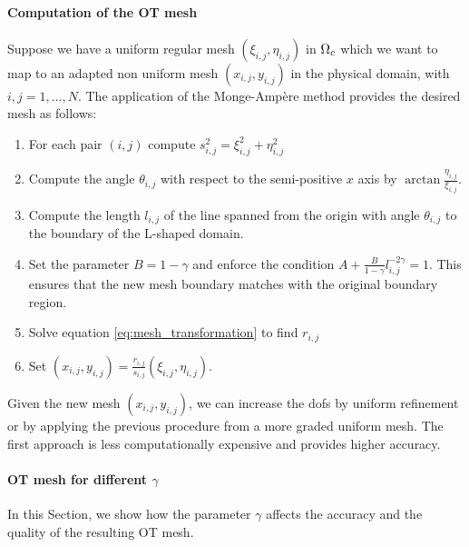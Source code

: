 \documentclass[a4paper,11pt]{article}
\begin{document}
\paragraph{Computation of the OT mesh}

Suppose we have a uniform regular mesh $(\xi_{i,j},\eta_{i,j})$ in $\Omega_{c}$ which we want to map to an adapted non uniform mesh $(x_{i,j},y_{i,j})$ in the physical domain, with $i,j = 1,\dots,N$. The application of the Monge-Ampère method provides the desired mesh as follows:

\begin{enumerate}
    \item For each pair $(i,j)$ compute $s_{i,j}^{2} = \xi_{i,j}^{2} + \eta_{i,j}^{2}$
    \item Compute the angle $\theta_{i,j}$ with respect to the semi-positive $x$ axis by $\arctan{\frac{\eta_{i,j}}{\xi_{i,j}}}$. 
    \item Compute the length $l_{i,j}$ of the line spanned from the origin with angle $\theta_{i,j}$ to the boundary of the L-shaped domain.
    \item Set the parameter $B = 1 - \gamma$ and enforce the condition $A + \frac{B}{1-\gamma}l_{i,j}^{-2\gamma} = 1$. This ensures that the new mesh boundary matches with the original boundary region.
      
    \item Solve equation \eqref{eq:mesh_transformation} to find $r_{i,j}$
    \item Set $(x_{i,j},y_{i,j}) = \frac{r_{i,j}}{s_{i,j}}(\xi_{i,j},\eta_{i,j})$.
\end{enumerate}


Given the new mesh $(x_{i,j},y_{i,j})$, we can increase the dofs by uniform refinement or by applying the previous procedure from a more graded uniform mesh. The first approach is less computationally expensive and provides higher accuracy.


\paragraph{OT mesh for different $\gamma$}

In this Section, we show how the parameter $\gamma$ affects the accuracy and the quality of the resulting OT mesh. 
\end{document}
